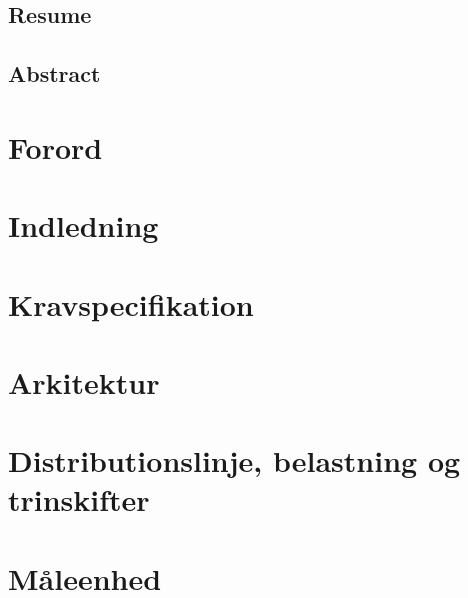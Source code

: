 \documentclass[a4paper, 11pt,oneside,openany, danish]{memoir} %
\begin{document}

\frontmatter

             
\section{Resume}
\section{Abstract}



\tableofcontents

\mainmatter
\chapter{Forord}  
                     
\chapter{Indledning}

\chapter{Kravspecifikation}




\chapter{Arkitektur}




\chapter{Distributionslinje, belastning og trinskifter}





\chapter{Måleenhed}










\end{document}
